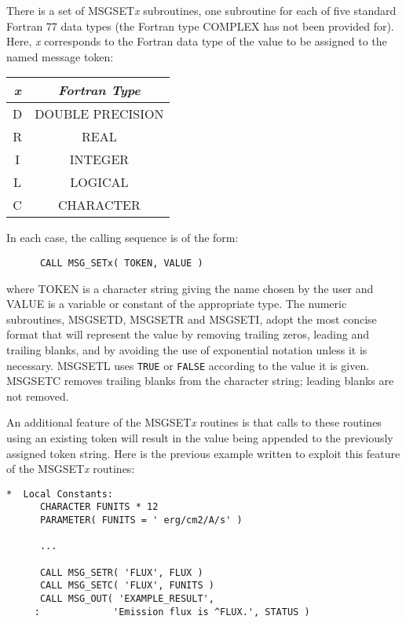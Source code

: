 \documentclass[twoside,11pt]{article}
\renewcommand{\_}{\texttt{\symbol{95}}}
\begin{document}
There is a set of MSG\_SET\textit{x} subroutines, one subroutine for each of five
standard Fortran 77 data types (the Fortran type COMPLEX has not been provided
for).
Here, \textit{x} corresponds to the Fortran data type of the value to be assigned
to the named message token:

\begin {center}
\begin {tabular}{||c|c||}
\hline
\textit{x} & \textit{Fortran Type}\\
\hline
D & DOUBLE PRECISION\\
R & REAL\\
I & INTEGER\\
L & LOGICAL\\
C & CHARACTER\\
\hline
\end {tabular}
\end {center}

In each case, the calling sequence is of the form:

\begin {small}
\begin{verbatim}
      CALL MSG_SETx( TOKEN, VALUE )
\end{verbatim}
\end {small}

where TOKEN is a character string giving the name chosen by the user and VALUE
is a variable or constant of the appropriate type.
The numeric subroutines, MSG\_SETD, MSG\_SETR and MSG\_SETI, adopt the most
concise format that will represent the value by removing trailing zeros,
leading and trailing blanks, and by avoiding the use of exponential notation
unless it is necessary. 
MSG\_SETL uses \texttt{TRUE} or \texttt{FALSE} according to the value it is
given. MSG\_SETC removes trailing blanks from the character string; leading
blanks are not removed.

An additional feature of the MSG\_SET\textit{x} routines is that calls to these 
routines using an existing token will result in the value being appended 
to the previously assigned token string.
Here is the previous example written to exploit this feature of the 
MSG\_SET\textit{x} routines:

\begin {small}
\begin{verbatim}
*  Local Constants:
      CHARACTER FUNITS * 12
      PARAMETER( FUNITS = ' erg/cm2/A/s' )

      ...

      CALL MSG_SETR( 'FLUX', FLUX )
      CALL MSG_SETC( 'FLUX', FUNITS )
      CALL MSG_OUT( 'EXAMPLE_RESULT', 
     :             'Emission flux is ^FLUX.', STATUS )
\end{verbatim}
\end {small}
\end{document}
